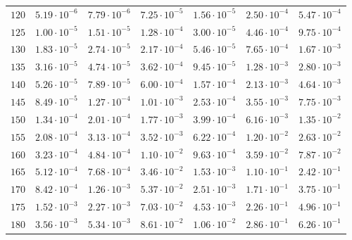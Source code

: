 \begin{table}[h]
\begin{tabular}{lcccccc}
$	120	$ & $	5.19 \cdot 10^{-6} 	$ & $	7.79 \cdot 10^{-6} 	$ & $	7.25 \cdot 10^{-5} 	$ & $	1.56 \cdot 10^{-5} 	$ & $	2.50 \cdot 10^{-4} 	$ & $	5.47 \cdot 10^{-4} 	 $ \\
$	125	$ & $	1.00 \cdot 10^{-5} 	$ & $	1.51 \cdot 10^{-5} 	$ & $	1.28 \cdot 10^{-4} 	$ & $	3.00 \cdot 10^{-5} 	$ & $	4.46 \cdot 10^{-4} 	$ & $	9.75 \cdot 10^{-4} 	 $ \\
$	130	$ & $	1.83 \cdot 10^{-5} 	$ & $	2.74 \cdot 10^{-5} 	$ & $	2.17 \cdot 10^{-4} 	$ & $	5.46 \cdot 10^{-5} 	$ & $	7.65 \cdot 10^{-4} 	$ & $	1.67 \cdot 10^{-3} 	 $ \\
$	135	$ & $	3.16 \cdot 10^{-5} 	$ & $	4.74 \cdot 10^{-5} 	$ & $	3.62 \cdot 10^{-4} 	$ & $	9.45 \cdot 10^{-5} 	$ & $	1.28 \cdot 10^{-3} 	$ & $	2.80 \cdot 10^{-3} 	 $ \\
$	140	$ & $	5.26 \cdot 10^{-5} 	$ & $	7.89 \cdot 10^{-5} 	$ & $	6.00 \cdot 10^{-4} 	$ & $	1.57 \cdot 10^{-4} 	$ & $	2.13 \cdot 10^{-3} 	$ & $	4.64 \cdot 10^{-3} 	 $ \\
$	145	$ & $	8.49 \cdot 10^{-5} 	$ & $	1.27 \cdot 10^{-4} 	$ & $	1.01 \cdot 10^{-3} 	$ & $	2.53 \cdot 10^{-4} 	$ & $	3.55 \cdot 10^{-3} 	$ & $	7.75 \cdot 10^{-3} 	 $ \\
$	150	$ & $	1.34 \cdot 10^{-4} 	$ & $	2.01 \cdot 10^{-4} 	$ & $	1.77 \cdot 10^{-3} 	$ & $	3.99 \cdot 10^{-4} 	$ & $	6.16 \cdot 10^{-3} 	$ & $	1.35 \cdot 10^{-2} 	 $ \\
$	155	$ & $	2.08 \cdot 10^{-4} 	$ & $	3.13 \cdot 10^{-4} 	$ & $	3.52 \cdot 10^{-3} 	$ & $	6.22 \cdot 10^{-4} 	$ & $	1.20 \cdot 10^{-2} 	$ & $	2.63 \cdot 10^{-2} 	 $ \\
$	160	$ & $	3.23 \cdot 10^{-4} 	$ & $	4.84 \cdot 10^{-4} 	$ & $	1.10 \cdot 10^{-2} 	$ & $	9.63 \cdot 10^{-4} 	$ & $	3.59 \cdot 10^{-2} 	$ & $	7.87 \cdot 10^{-2} 	 $ \\
$	165	$ & $	5.12 \cdot 10^{-4} 	$ & $	7.68 \cdot 10^{-4} 	$ & $	3.46 \cdot 10^{-2} 	$ & $	1.53 \cdot 10^{-3} 	$ & $	1.10 \cdot 10^{-1} 	$ & $	2.42 \cdot 10^{-1} 	 $ \\
$	170	$ & $	8.42 \cdot 10^{-4} 	$ & $	1.26 \cdot 10^{-3} 	$ & $	5.37 \cdot 10^{-2} 	$ & $	2.51 \cdot 10^{-3} 	$ & $	1.71 \cdot 10^{-1} 	$ & $	3.75 \cdot 10^{-1} 	 $ \\
$	175	$ & $	1.52 \cdot 10^{-3} 	$ & $	2.27 \cdot 10^{-3} 	$ & $	7.03 \cdot 10^{-2} 	$ & $	4.53 \cdot 10^{-3} 	$ & $	2.26 \cdot 10^{-1} 	$ & $	4.96 \cdot 10^{-1} 	 $ \\
$	180	$ & $	3.56 \cdot 10^{-3} 	$ & $	5.34 \cdot 10^{-3} 	$ & $	8.61 \cdot 10^{-2} 	$ & $	1.06 \cdot 10^{-2} 	$ & $	2.86 \cdot 10^{-1} 	$ & $	6.26 \cdot 10^{-1} 	 $ \\

\end{tabular}
\end{table}
